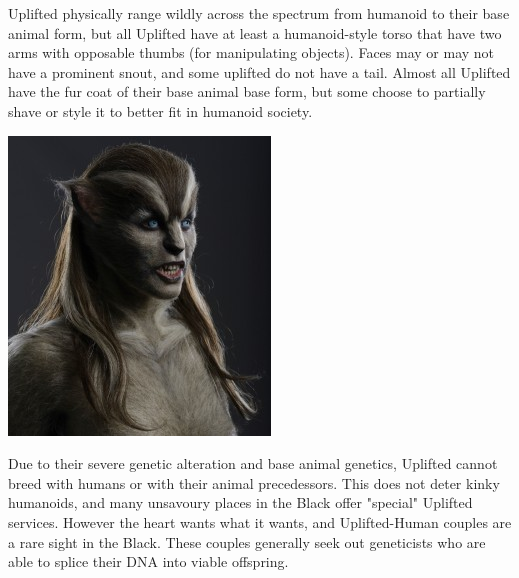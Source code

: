 \documentclass[10pt,twoside]{article}
\begin{document}
\begin{multicols}{2}
  \columnbreak

  Uplifted physically range wildly across the spectrum from humanoid to their base animal form, but all Uplifted have at least a humanoid-style torso that have two arms with opposable thumbs (for manipulating objects). Faces may or may not have a prominent snout, and some uplifted do not have a tail. Almost all Uplifted have the fur coat of their base animal base form, but some choose to partially shave or style it to better fit in humanoid society.

  \includegraphics[width=\linewidth]{wolves-movie-still-1-263x300}

  Due to their severe genetic alteration and base animal genetics, Uplifted cannot breed with humans or with their animal precedessors. This does not deter kinky humanoids, and many unsavoury places in the Black offer "special" Uplifted services. However the heart wants what it wants, and Uplifted-Human couples are a rare sight in the Black. These couples generally seek out geneticists who are able to splice their DNA into viable offspring.


\end{multicols}
\end{document}
